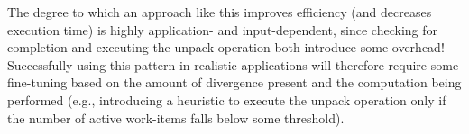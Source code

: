 The degree to which an approach like this improves efficiency (and decreases execution time) is highly application- and input-dependent, since checking for completion and executing the unpack operation both introduce some overhead! Successfully using this pattern in realistic applications will therefore require some fine-tuning based on the amount of divergence present and the computation being performed (e.g., introducing a heuristic to execute the unpack operation only if the number of active work-items falls below some threshold).\par






















